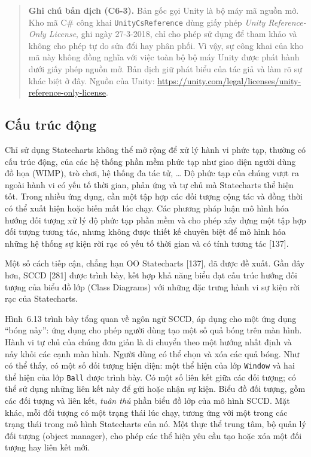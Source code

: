 \begin{quote}
\small\textbf{Ghi chú bản dịch (C6-3).} Bản gốc gọi Unity là bộ máy mã nguồn mở. Kho mã C\# công khai \texttt{UnityCsReference} dùng giấy phép \emph{Unity Reference-Only License}, ghi ngày 27-3-2018, chỉ cho phép sử dụng để tham khảo và không cho phép tự do sửa đổi hay phân phối. Vì vậy, sự công khai của kho mã này không đồng nghĩa với việc toàn bộ bộ máy Unity được phát hành dưới giấy phép nguồn mở. Bản dịch giữ phát biểu của tác giả và làm rõ sự khác biệt ở đây. Nguồn của Unity: \url{https://unity.com/legal/licenses/unity-reference-only-license}.
\end{quote}

\subsection{Cấu trúc động}
Chỉ sử dụng Statecharts không thể mở rộng để xử lý hành vi phức tạp, thường có cấu trúc động, của các hệ thống phần mềm phức tạp như giao diện người dùng đồ họa (WIMP), trò chơi, hệ thống đa tác tử, \ldots{} Độ phức tạp của chúng vượt ra ngoài hành vi có yếu tố thời gian, phản ứng và tự chủ mà Statecharts thể hiện tốt. Trong nhiều ứng dụng, cần một tập hợp các đối tượng cộng tác và đồng thời có thể xuất hiện hoặc biến mất lúc chạy. Các phương pháp luận mô hình hóa hướng đối tượng xử lý độ phức tạp phần mềm và cho phép xây dựng một tập hợp đối tượng tương tác, nhưng không được thiết kế chuyên biệt để mô hình hóa những hệ thống sự kiện rời rạc có yếu tố thời gian và có tính tương tác [137].

Một số cách tiếp cận, chẳng hạn OO Statecharts [137], đã được đề xuất. Gần đây hơn, SCCD [281] được trình bày, kết hợp khả năng biểu đạt cấu trúc hướng đối tượng của biểu đồ lớp (Class Diagrams) với những đặc trưng hành vi sự kiện rời rạc của Statecharts.

Hình~6.13 trình bày tổng quan về ngôn ngữ SCCD, áp dụng cho một ứng dụng ``bóng nảy'': ứng dụng cho phép người dùng tạo một số quả bóng trên màn hình. Hành vi tự chủ của chúng đơn giản là di chuyển theo một hướng nhất định và nảy khỏi các cạnh màn hình. Người dùng có thể chọn và xóa các quả bóng. Như có thể thấy, có một số đối tượng hiện diện: một thể hiện của lớp \texttt{Window} và hai thể hiện của lớp \texttt{Ball} được trình bày. Có một số liên kết giữa các đối tượng; có thể sử dụng những liên kết này để gửi hoặc nhận sự kiện. Biểu đồ đối tượng, gồm các đối tượng và liên kết, \emph{tuân thủ} phần biểu đồ lớp của mô hình SCCD. Mặt khác, mỗi đối tượng có một trạng thái lúc chạy, tương ứng với một trong các trạng thái trong mô hình Statecharts của nó. Một thực thể trung tâm, bộ quản lý đối tượng (object manager), cho phép các thể hiện yêu cầu tạo hoặc xóa một đối tượng hay liên kết mới.

